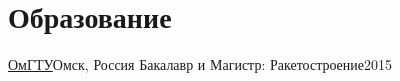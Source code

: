 \section{Образование}
  \resumeSubHeadingListStart

    \resumeSubheading
      {\href{https://omgtu.ru/}{ОмГТУ}}{Омск, Россия}
      {Бакалавр и Магистр: Ракетостроение}{2015}
      
  \resumeSubHeadingListEnd
